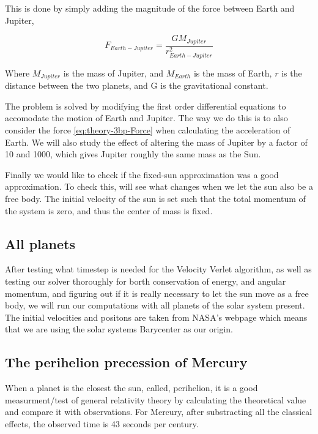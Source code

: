 \documentclass[../main.tex]{subfiles}
\begin{document}
This is done by simply adding the magnitude of the force between Earth and Jupiter,

\begin{equation}
  F_{Earth-Jupiter} = \frac{GM_{Jupiter}}{r^2_{Earth-Jupiter}} \label{eq:theory-3bp-Force}
\end{equation}

Where $M_{Jupiter}$ is the mass of Jupiter, and $M_{Earth}$ is the mass of Earth, $r$ is the distance between the two planets, and G is the gravitational constant.

The problem is solved by modifying the first order differential equations to accomodate the motion of Earth and Jupiter. The way we do this is to also consider the force \eqref{eq:theory-3bp-Force} when calculating the acceleration of Earth. We will also study the effect of altering the mass of Jupiter by a factor of 10 and 1000, which gives Jupiter roughly the same mass as the Sun.

Finally we would like to check if the fixed-sun approximation was a good approximation. To check this, will see what changes when we let the sun also be a free body. The initial velocity of the sun is set such that the total momentum of the system is zero, and thus the center of mass is fixed.

\subsection{All planets}
After testing what timestep is needed for the Velocity Verlet algorithm, as well as testing our solver thoroughly for borth conservation of energy, and angular momentum, and figuring out if it is really necessary to let the sun move as a free body, we will run our computations with all planets of the solar system present.
The initial velocities and positons are taken from NASA's webpage \cite{HorizonsNASA} which means that we are using the solar systems Barycenter as our origin.

\subsection{The perihelion precession of Mercury}
When a planet is the closest the sun, called, perihelion, it is a good measurment/test of general relativity theory by calculating the theoretical value and compare it with observations. For Mercury, after substracting all the classical effects, the observed time is 43 seconds per century.
\end{document}
